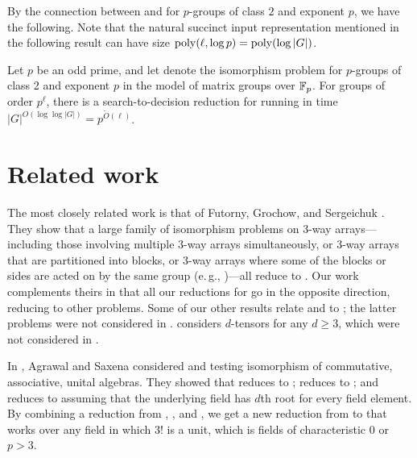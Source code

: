 By the connection between \AltMatSpIsomlong and \GpIlong for $p$-groups of class $2$ and exponent $p$, we have 
the following. 
Note that the natural succinct input representation mentioned in the following 
result can have size $\mathrm{poly}(\ell, \log p) = \mathrm{poly}(\log |G|)$. 

\begin{maincorollary} \label{cor:search_decision}
Let $p$ be an odd prime, and let  denote the 
isomorphism problem for $p$-groups of class 2 and exponent $p$ in the model of 
matrix groups over $\mathbb{F}_p$.
For groups of order $p^\ell$, there is a search-to-decision reduction 
for  running in time $|G|^{O(\log 
\log |G|)}=p^{\tilde{O}(\ell)}$.
\end{maincorollary}

\section{Related work} \label{sec:related}
The most closely related work is that of Futorny, Grochow, and Sergeichuk 
\cite{FGS19}. They show that a large family of 
isomorphism problems on 3-way 
arrays---including those involving multiple 3-way arrays simultaneously, or 3-way 
arrays that are partitioned into blocks, or 3-way arrays where some of the blocks 
or sides are acted on by the same group (e.\,g., \MatSpIsomlong)---all reduce to 
\ThreeTI. Our work complements theirs in that all our reductions 
for 
go in the 
opposite direction, reducing \ThreeTI to other problems. Some of our other results 
relate \GI and \CodeEqlong to \ThreeTI; the latter problems were not considered in 
\cite{FGS19}. 
 considers $d$-tensors for any $d \geq 3$, which were not 
considered in \cite{FGS19}.

In \cite{AS05,AS06}, Agrawal and Saxena considered  and testing isomorphism of commutative, associative, unital algebras.
They showed that \GI reduces to \AlgIsolong;  reduces to 
\CubicFormlong;
and     reduces to 
\AlgIsolong
assuming that the underlying field has $d$th root for every field element. 
By combining a reduction from \cite{FGS19}, 
, and , we get a new 
reduction from \CubicFormlong to  that works over 
any field in which $3!$ is a unit, which is fields of characteristic $0$ or $p > 3$.

